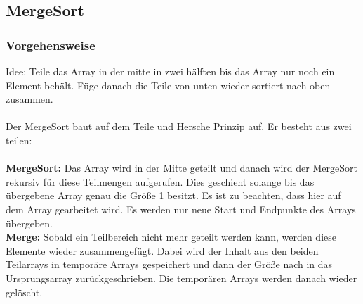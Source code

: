 \documentclass{article}
\begin{document}
\subsection{MergeSort}
\subsubsection{Vorgehensweise}
Idee: Teile das Array in der mitte in zwei hälften bis das Array nur noch ein Element behält. Füge danach die Teile von unten wieder sortiert nach oben zusammen. \\
\\
Der MergeSort baut auf dem Teile und Hersche Prinzip auf. Er besteht aus zwei teilen:
\\ \\
\textbf{MergeSort:} Das Array wird in der Mitte geteilt und danach wird der MergeSort rekursiv für diese Teilmengen aufgerufen. Dies geschieht solange bis das übergebene Array genau die Größe 1 besitzt. Es ist zu beachten, dass hier auf dem Array gearbeitet wird. Es werden nur neue Start und Endpunkte des Arrays übergeben. \\
\textbf{Merge: } Sobald ein Teilbereich nicht mehr geteilt werden kann, werden diese Elemente wieder zusammengefügt. Dabei wird der Inhalt aus den beiden Teilarrays in temporäre Arrays gespeichert und dann der Größe nach in das Ursprungsarray zurückgeschrieben. Die temporären Arrays werden danach wieder gelöscht. 
\end{document}
